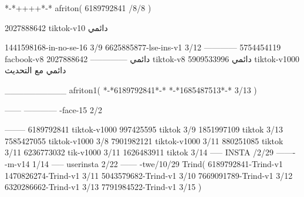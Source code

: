 *-*++++*-*
afriton(
6189792841 /8/8
)

2027888642 tiktok-v10
دائمي

1441598168-in-no-se-16 3/9
6625885877-lse-ins-v1 3/12
------------
5754454119 facbook-v8
دائمي
--------------
2027888642 tiktok-v8
دائمي
5909533996 tiktok-v1000
دائمي مع التحديث

__________
afriton1(
*-*6189792841*-*
*-*1685487513*-* 3/13
)


------
------------
-face-15 2/2

--------
6189792841 tiktok-v1000
997425595 tiktok 3/9
1851997109 tiktok 3/13
7585427055 tiktok-v1000 3/8
7901982121 tiktok-v1000 3/11
880251085 tiktok 3/11
6236773032 tik-v1000 3/11
1626483911 tiktok 3/14
-----
 INSTA /2/29
-------
-m-v14 1/14
-----
userinsta 2/22
------
-twe/10/29
Trind(
6189792841-Trind-v1 
1470826274-Trind-v1 3/11
5043579682-Trind-v1 3/10
7669091789-Trind-v1 3/12
6320286662-Trind-v1 3/13
7791984522-Trind-v1 3/15
)

